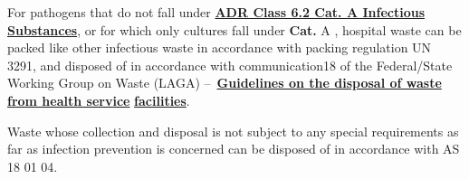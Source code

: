 \documentclass{article}
\begin{document}
For pathogens that do not fall under \textbf{\href{https://adrbook.com/en/2017/ADR/2.2.62}{ADR Class 6.2 Cat. A Infectious}}\href{https://adrbook.com/en/2017/ADR/2.2.62}{ }\textbf{\href{https://adrbook.com/en/2017/ADR/2.2.62}{Substances}}, or for which only cultures fall under \textbf{Cat. }A\textbf{ }, hospital waste can be packed like other infectious waste in accordance with packing regulation UN 3291, and disposed of in accordance with communication18 of the Federal/State Working Group on Waste (LAGA) – \textbf{\href{https://www.laga-online.de/documents/m_2_3_1517834373.pdf}{Guidelines on the disposal of waste from health service}}\textbf{ }\textbf{\href{https://www.laga-online.de/documents/m_2_3_1517834373.pdf}{facilities}}.


Waste whose collection and disposal is not subject to any special requirements as far as infection prevention is concerned can be disposed of in accordance with AS 18 01 04.
\end{document}
